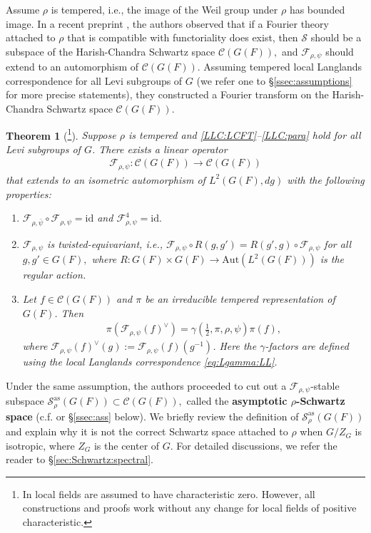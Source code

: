 \documentclass[10pt]{amsart}
\newtheorem{theorem}{Theorem}[section]
\theoremstyle{definition}
\numberwithin{equation}{section}
\numberwithin{equation}{subsection}
\begin{document}
Assume $\rho$ is tempered, i.e., the image of the Weil group under $\rho$ has bounded image. In a recent preprint \cite{DRS}, the authors observed that if a Fourier theory attached to $\rho$ that is compatible with functoriality does exist, then $\mathcal{S}$ should be a subspace of the Harish-Chandra Schwartz space $\mathcal{C}(G(F)),$ and $\mathcal{F}_{\rho,\psi}$ should extend to an automorphism of $\mathcal{C}(G(F))$. Assuming tempered local Langlands correspondence for all Levi subgroups of $G$ (we refer one to \S\ref{ssec:assumptions} for more precise statements), they constructed a Fourier transform on the Harish-Chandra Schwartz space $\mathcal{C}(G(F)).$
\begin{theorem}[{\cite{DRS}}\footnote{ In \cite{DRS} local fields are assumed to have characteristic zero. However, all constructions and proofs work without any change for local fields of positive characteristic. }]
    Suppose $\rho$ is tempered and \eqref{LLC:LCFT}--\eqref{LLC:para} hold for all Levi subgroups of $G$. There exists a linear operator 
    \begin{align*}
        \mathcal{F}_{\rho,\psi}:\mathcal{C}(G(F))\to \mathcal{C}(G(F))
    \end{align*}
    that extends to an isometric automorphism of $L^2(G(F),dg)$ with the following properties:
    \begin{enumerate}
        \item $\mathcal{F}_{\rho,\bar{\psi}}\circ \mathcal{F}_{\rho,\psi}=\mathrm{id}$ and $\mathcal{F}_{\rho,\psi}^4=\mathrm{id}.$
        \item $\mathcal{F}_{\rho,\psi}$ is twisted-equivariant, i.e., $\mathcal{F}_{\rho,\psi}\circ R(g,g') = R(g',g)\circ \mathcal{F}_{\rho,\psi}$ for all $g,g'\in G(F),$ where $R:G(F)\times G(F)\longrightarrow\mathrm{Aut}(L^2(G(F)))$ is the regular action.
        \item Let $f\in \mathcal{C}(G(F))$ and $\pi$ be an irreducible tempered representation of $G(F)$. Then
        \begin{align*}
            \pi(\mathcal{F}_{\rho,\psi}(f)^\lor)=\gamma(\tfrac{1}{2},\pi,\rho,\psi)\pi(f),
        \end{align*}
        where $\mathcal{F}_{\rho,\psi}(f)^\lor(g):=\mathcal{F}_{\rho,\psi}(f)(g^{-1})$. Here the $\gamma$-factors are defined using the local Langlands correspondence \eqref{eq:Lgamma:LL}.
    \end{enumerate}
\end{theorem}

Under the same assumption, the authors proceeded to cut out a $\mathcal{F}_{\rho,\psi}$-stable subspace $\mathcal{S}^{\mathrm{as}}_\rho(G(F))\subset \mathcal{C}(G(F)),$ called the \textbf{asymptotic $\rho$-Schwartz space} (c.f.  \cite[\S 5]{DRS} or \S \ref{ssec:ass} below). We briefly review the definition of $\mathcal{S}^{\mathrm{as}}_\rho(G(F))$ and explain why it is not the correct Schwartz space attached to $\rho$ when $G/Z_G$ is isotropic, where $Z_G$ is the center of $G$. For detailed discussions, we refer the reader to \S \ref{sec:Schwartz:spectral}.
\end{document}
